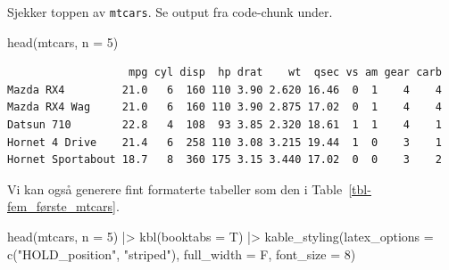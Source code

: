 \documentclass[
  letterpaper,
  DIV=11,
  numbers=noendperiod]{scrartcl}
\newenvironment{Shaded}{\begin{snugshade}}{\end{snugshade}}
\newcommand{\AttributeTok}[1]{\textcolor[rgb]{0.40,0.45,0.13}{#1}}
\newcommand{\DecValTok}[1]{\textcolor[rgb]{0.68,0.00,0.00}{#1}}
\newcommand{\FunctionTok}[1]{\textcolor[rgb]{0.28,0.35,0.67}{#1}}
\newcommand{\NormalTok}[1]{\textcolor[rgb]{0.00,0.23,0.31}{#1}}
\newcommand{\SpecialCharTok}[1]{\textcolor[rgb]{0.37,0.37,0.37}{#1}}
\newcommand{\StringTok}[1]{\textcolor[rgb]{0.13,0.47,0.30}{#1}}
\begin{document}
Sjekker toppen av \texttt{mtcars}. Se output fra code-chunk under.

\begin{Shaded}
\begin{Highlighting}[]
\FunctionTok{head}\NormalTok{(mtcars, }\AttributeTok{n =} \DecValTok{5}\NormalTok{)}
\end{Highlighting}
\end{Shaded}

\begin{verbatim}
                   mpg cyl disp  hp drat    wt  qsec vs am gear carb
Mazda RX4         21.0   6  160 110 3.90 2.620 16.46  0  1    4    4
Mazda RX4 Wag     21.0   6  160 110 3.90 2.875 17.02  0  1    4    4
Datsun 710        22.8   4  108  93 3.85 2.320 18.61  1  1    4    1
Hornet 4 Drive    21.4   6  258 110 3.08 3.215 19.44  1  0    3    1
Hornet Sportabout 18.7   8  360 175 3.15 3.440 17.02  0  0    3    2
\end{verbatim}

Vi kan også generere fint formaterte tabeller som den i
Table~\ref{tbl-fem_første_mtcars}.

\begin{Shaded}
\begin{Highlighting}[]
\FunctionTok{head}\NormalTok{(mtcars, }\AttributeTok{n =} \DecValTok{5}\NormalTok{) }\SpecialCharTok{|\textgreater{}}
  \FunctionTok{kbl}\NormalTok{(}\AttributeTok{booktabs =}\NormalTok{ T) }\SpecialCharTok{|\textgreater{}}
  \FunctionTok{kable\_styling}\NormalTok{(}\AttributeTok{latex\_options =} \FunctionTok{c}\NormalTok{(}\StringTok{"HOLD\_position"}\NormalTok{, }\StringTok{"striped"}\NormalTok{),}
                \AttributeTok{full\_width =}\NormalTok{ F, }\AttributeTok{font\_size =} \DecValTok{8}\NormalTok{)}
\end{Highlighting}
\end{Shaded}
\end{document}
